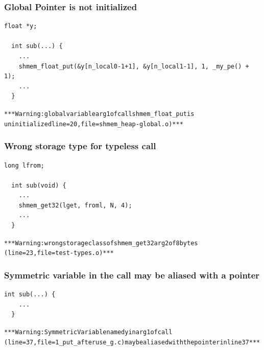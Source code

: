 \subsubsection{Global Pointer is not initialized}

\begin{lstlisting}[language=OSH+C]
  float *y;

  int sub(...) {
    ...
    shmem_float_put(&y[n_local0-1+1], &y[n_local1-1], 1, _my_pe() + 1);
    ...
  }
\end{lstlisting}
\begin{alltt}
  *** \openshmem Warning: global variable arg1 of call shmem_float_put is 
  uninitialized line=20, file=shmem_heap-global.o) ***
\end{alltt}

\subsubsection{Wrong storage type for typeless \openshmem call}

\begin{lstlisting}[language=OSH+C]
  long lfrom;

  int sub(void) {
    ...
    shmem_get32(lget, froml, N, 4);
    ...
  }
\end{lstlisting}
\begin{alltt}
  *** \openshmem Warning: wrong storage class of shmem_get32 arg2 of 8 bytes 
  (line=23, file=test-types.o) ***
\end{alltt}

\subsubsection{Symmetric variable in the \openshmem call may be aliased with a pointer}

\begin{lstlisting}[language=OSH+C]
  int sub(...) {
    ...
  }
\end{lstlisting}
\begin{alltt}
  *** \openshmem Warning: Symmetric Variable named y in arg1 of \openshmem call 
  (line=37, file=1_put_afteruse_g.c) may be aliased with the pointer in line 37***
\end{alltt}

